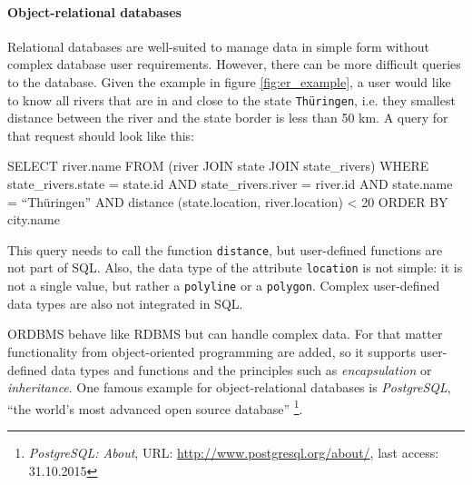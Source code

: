 
\paragraph{Object-relational databases} %
\label{par:object_relational_databases}

Relational databases are well-suited to manage data in simple form without complex database user requirements. However, there can be more difficult queries to the database. Given the example in figure \ref{fig:er_example}, a user would like to know all rivers that are in and close to the state \texttt{Thüringen}, i.e. they smallest distance between the river and the state border is less than 50 km. A query for that request should look like this:
\begin{verbatimtab}
  SELECT    river.name
  FROM      (river JOIN state JOIN state_rivers)
  WHERE     state_rivers.state = state.id AND
            state_rivers.river = river.id AND
            state.name = ``Thüringen'' AND
            distance (state.location, river.location) < 20
  ORDER BY  city.name
\end{verbatimtab}

This query needs to call the function \texttt{distance}, but user-defined functions are not part of SQL. Also, the data type of the attribute \texttt{location} is not simple: it is not a single value, but rather a \texttt{polyline} or a \texttt{polygon}. Complex user-defined data types are also not integrated in SQL.

ORDBMS behave like RDBMS but can handle complex data. For that matter functionality from object-oriented programming are added, so it supports user-defined data types and functions and the principles such as \emph{encapsulation} or \emph{inheritance}.
One famous example for object-relational databases is \emph{PostgreSQL}, ``the world's most advanced open source database''
\footnote{
  \textit{PostgreSQL: About},
  URL: \url{http://www.postgresql.org/about/},
  last access: 31.10.2015
}.

